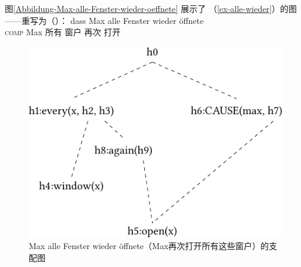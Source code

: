 图\vref{Abbildung-Max-alle-Fenster-wieder-oeffnete} 展示了 （\ref{ex-alle-wieder}）的图——重写为（）：
\ea
\label{ex-alle-wieder-zwei}
\gll dass Max alle Fenster wieder öffnete\\
	 \textsc{comp} Max 所有 窗户 再次 打开\\
\z
\begin{figure}
\centering
\includegraphics{Figures/mrs-max-alle-fenster-wieder-oeffnete-cropped.pdf}
\caption{Max alle Fenster wieder öffnete（Max再次打开所有这些窗户）的支配图\label{Abbildung-Max-alle-Fenster-wieder-oeffnete}}
\end{figure}%
